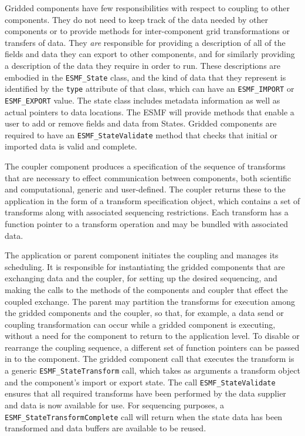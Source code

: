 Gridded components have few responsibilities with respect to coupling
to other components.  They do not need to keep track of the data needed
by other components or to provide methods for inter-component 
grid transformations or transfers of data.  They {\it are} responsible for 
providing a description of all of the fields and data they
can export to other components, and for similarly providing a description 
of the data they require in order to run.  These descriptions are
embodied in the {\tt ESMF\_State} class, and the kind of data that they 
represent is identified by the {\tt type} attribute of that class, which can
have an {\tt ESMF\_IMPORT} or {\tt ESMF\_EXPORT} value.  The state class
includes metadata information as well as actual pointers to data 
locations.  The ESMF will provide methods that enable a user to add or
remove fields and data from States.  Gridded components are required to 
have an {\tt ESMF\_StateValidate} method that checks that initial or 
imported data is valid and complete.  

The coupler component produces a specification of the sequence of 
transforms that are necessary to effect communication between components, 
both scientific and computational, generic and user-defined.  The coupler 
returns these to the application in the form of a 
transform specification object, which contains a set of transforms 
along with associated sequencing restrictions.  Each transform has a
function pointer to a transform operation and may be bundled with 
associated data.

The application or parent component initiates the coupling and manages 
its scheduling.  It is responsible for instantiating the gridded components
that are exchanging data and the coupler, for setting up the desired 
sequencing, and making the calls to the methods of the components and 
coupler that effect the coupled exchange.  The parent may partition the 
transforms
for execution among the gridded components and the coupler, so that, for 
example, a data send or coupling transformation can occur while a gridded 
component is executing, without a need for the component to return to the
application level.  
To disable or rearrange the coupling sequence, a different set of function
pointers can be passed in to the component.
The gridded component call that executes the transform
is a generic {\tt ESMF\_StateTransform} call, which takes as arguments a
transform object and the component's import or export state. The
call {\tt ESMF\_StateValidate} ensures that all required transforms
have been performed by the data supplier and data is now available
for use.  For sequencing purposes, a {\tt ESMF\_StateTransformComplete} call
will return when the state data has been transformed and data
buffers are available to be reused.

